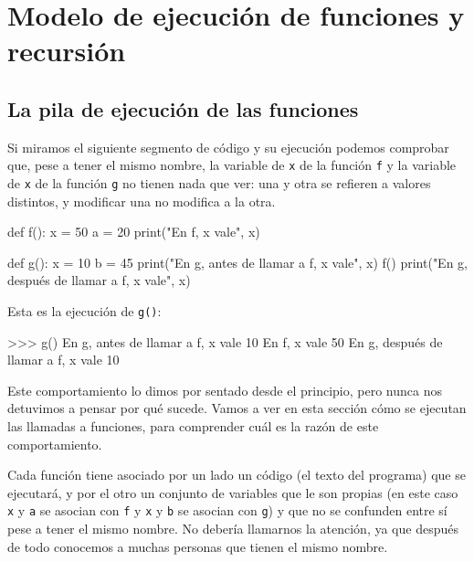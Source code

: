 \chapter{Modelo de ejecución de funciones y recursión}

\section{La pila de ejecución de las funciones}


Si miramos el siguiente segmento de código y su ejecución podemos comprobar
que, pese a tener el mismo nombre, la variable de \lstinline!x! de la función
\lstinline!f! y la variable de \lstinline!x! de la función \lstinline!g! no
tienen nada que ver: una y otra se refieren a valores distintos, y modificar
una no modifica a la otra.

\begin{codigo-python-sn}
def f():
    x = 50
    a = 20
    print("En f, x vale", x)

def g():
    x = 10
    b = 45
    print("En g, antes de llamar a f, x vale", x)
    f()
    print("En g, después de llamar a f, x vale", x)
\end{codigo-python-sn}

Esta es la ejecución de \lstinline!g()!:

\begin{codigo-python-sn}
>>> g()
En g, antes de llamar a f, x vale 10
En f, x vale 50
En g, después de llamar a f, x vale 10
\end{codigo-python-sn}

Este comportamiento lo dimos por sentado desde el principio, pero nunca nos
detuvimos a pensar por qué sucede.  Vamos a ver en esta sección cómo se
ejecutan las llamadas a funciones, para comprender cuál es la razón de este
comportamiento.

Cada función tiene asociado por un lado un código (el texto del programa)
que se ejecutará, y por el otro un conjunto de variables que le son propias
(en este caso \lstinline!x! y \lstinline!a! se asocian con \lstinline!f! y
\lstinline!x! y \lstinline!b! se asocian con \lstinline!g!) y que no se
confunden entre sí pese a tener el mismo nombre. No debería llamarnos la
atención, ya que después de todo conocemos a muchas personas que tienen el
mismo nombre.

